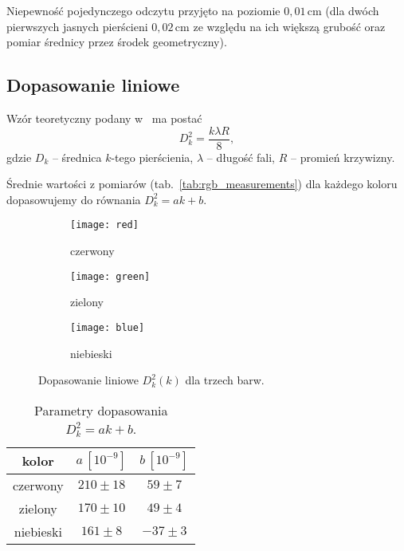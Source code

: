 \documentclass[12pt]{article}
\begin{document}
Niepewność pojedynczego odczytu przyjęto na poziomie \(0{,}01\,\mathrm{cm}\) (dla dwóch pierwszych jasnych pierścieni \(0{,}02\,\mathrm{cm}\) ze względu na ich większą grubość oraz pomiar średnicy przez środek geometryczny).

\subsection{Dopasowanie liniowe}

Wzór teoretyczny podany w~\cite{skrypt} ma postać
\begin{equation}
	D_k^2 = \frac{k \lambda R}{8},
	\label{eq:radius}
\end{equation}
gdzie \(D_k\) – średnica \(k\)-tego pierścienia, \(\lambda\) – długość fali, \(R\) – promień krzywizny.

Średnie wartości z pomiarów (tab.~\ref{tab:rgb_measurements}) dla każdego koloru dopasowujemy do równania \(D_k^2 = a k + b\).

\begin{figure}[H]
	\centering
	\begin{subfigure}{0.33\textwidth}
		\texttt{[image: red]}
		\caption{czerwony}
	\end{subfigure}\hfill
	\begin{subfigure}{0.33\textwidth}
		\texttt{[image: green]}
		\caption{zielony}
	\end{subfigure}\hfill
	\begin{subfigure}{0.33\textwidth}
		\texttt{[image: blue]}
		\caption{niebieski}
	\end{subfigure}
	\caption{Dopasowanie liniowe \(D_k^2(k)\) dla trzech barw.}
	\label{fig:line_graphs}
\end{figure}

\begin{table}[H]
	\centering
	\begin{tabular}{c|cc}
		\toprule
		kolor     & \(a\,[10^{-9}]\) & \(b\,[10^{-9}]\) \\
		\midrule
		czerwony  & \(210 \pm 18\)   & \(59 \pm 7\)     \\
		zielony   & \(170 \pm 10\)   & \(49 \pm 4\)     \\
		niebieski & \(161 \pm 8\)    & \(-37 \pm 3\)    \\
		\bottomrule
	\end{tabular}
	\caption{Parametry dopasowania \(D_k^2 = a k + b\).}
	\label{tab:lines_params}
\end{table}
\end{document}
